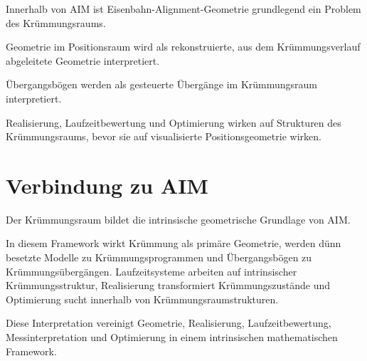 \begin{proposition}
Innerhalb von AIM ist Eisenbahn-Alignment-Geometrie grundlegend ein Problem
des Krümmungsraums.
\end{proposition}
\begin{proposition}
Geometrie im Positionsraum wird als rekonstruierte, aus dem
Krümmungsverlauf abgeleitete Geometrie interpretiert.
\end{proposition}
\begin{proposition}
Übergangsbögen werden als gesteuerte Übergänge im Krümmungsraum
interpretiert.
\end{proposition}
\begin{proposition}
Realisierung, Laufzeitbewertung und Optimierung wirken auf Strukturen des
Krümmungsraums, bevor sie auf visualisierte Positionsgeometrie wirken.
\end{proposition}

\section{Verbindung zu AIM}

\begin{summary}
Der Krümmungsraum bildet die intrinsische geometrische Grundlage von AIM.

In diesem Framework wirkt Krümmung als primäre Geometrie, werden dünn
besetzte Modelle zu Krümmungsprogrammen und Übergangsbögen zu
Krümmungsübergängen. Laufzeitsysteme arbeiten auf intrinsischer
Krümmungsstruktur, Realisierung transformiert Krümmungszustände und
Optimierung sucht innerhalb von Krümmungsraumstrukturen.

Diese Interpretation vereinigt Geometrie, Realisierung, Laufzeitbewertung,
Messinterpretation und Optimierung in einem intrinsischen mathematischen
Framework.
\end{summary}
